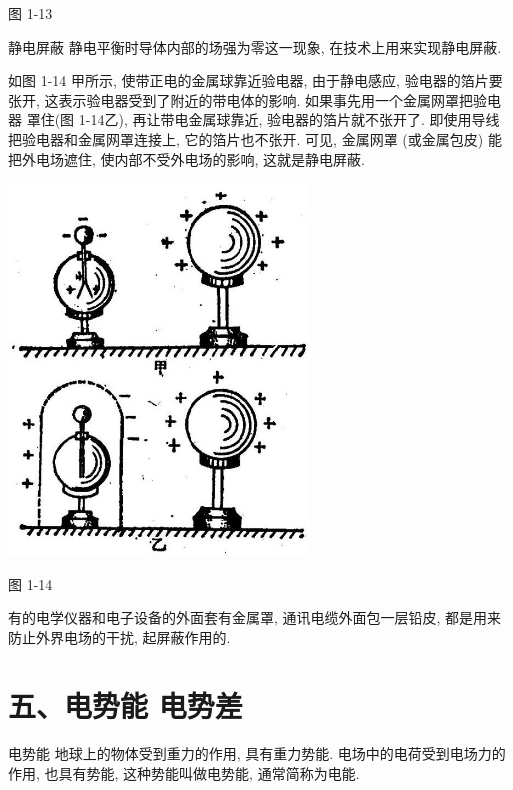 \documentclass[10pt]{article}
\begin{document}
图 1-13

静电屏蔽 静电平衡时导体内部的场强为零这一现象, 在技术上用来实现静电屏蔽.

如图 1-14 甲所示, 使带正电的金属球靠近验电器, 由于静电感应, 验电器的箔片要张开, 这表示验电器受到了附近的带电体的影响. 如果事先用一个金属网罩把验电器 罩住(图 1-14乙), 再让带电金属球靠近, 验电器的箔片就不张开了. 即使用导线把验电器和金属网罩连接上, 它的箔片也不张开. 可见, 金属网罩 (或金属包皮) 能把外电场遮住, 使内部不受外电场的影响, 这就是静电屏蔽.

\begin{center}
\includegraphics[max width=0.6\textwidth]{images/01913056-1f15-74d8-9184-9aab52c9d66b_27_599366.jpg}
\end{center}

图 1-14

有的电学仪器和电子设备的外面套有金属罩, 通讯电缆外面包一层铅皮, 都是用来防止外界电场的干扰, 起屏蔽作用的.

\section*{五、电势能 电势差}

电势能 地球上的物体受到重力的作用, 具有重力势能. 电场中的电荷受到电场力的作用, 也具有势能, 这种势能叫做电势能, 通常简称为电能.
\end{document}
